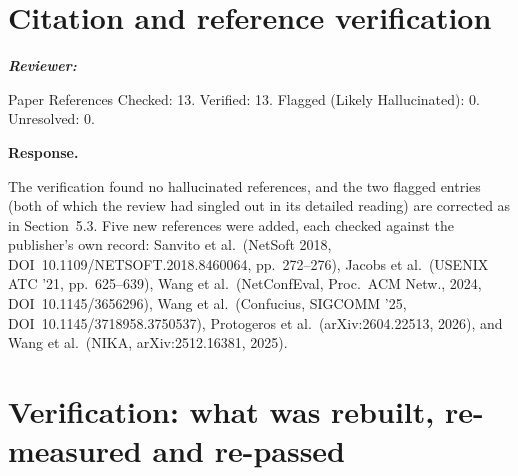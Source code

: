 \documentclass[11pt,a4paper]{article}
\newenvironment{reviewer}{\par\medskip\noindent\begin{minipage}{\linewidth}\small\itshape\color{quote}\textbf{Reviewer:}\par}{\end{minipage}\medskip\par}
\newenvironment{response}{\par\noindent\begin{minipage}{\linewidth}\small\textbf{Response.}\par}{\end{minipage}\medskip\par}
\begin{document}
\section{Citation and reference verification}

\begin{reviewer}
Paper References Checked: 13. Verified: 13. Flagged (Likely Hallucinated): 0.
Unresolved: 0.
\end{reviewer}

\begin{response}
The verification found no hallucinated references, and the two flagged
entries (both of which the review had singled out in its detailed reading)
are corrected as in Section~5.3. Five new references were added, each
checked against the publisher's own record: Sanvito et al.\ (NetSoft 2018,
DOI~10.1109/NETSOFT.2018.8460064, pp.~272--276), Jacobs et al.\ (USENIX
ATC '21, pp.~625--639), Wang et al.\ (NetConfEval, Proc.\ ACM Netw., 2024,
DOI~10.1145/3656296), Wang et al.\ (Confucius, SIGCOMM '25,
DOI~10.1145/3718958.3750537), Protogeros et al.\ (arXiv:2604.22513, 2026),
and Wang et al.\ (NIKA, arXiv:2512.16381, 2025).
\end{response}

\section{Verification: what was rebuilt, re-measured and re-passed}
\end{document}
